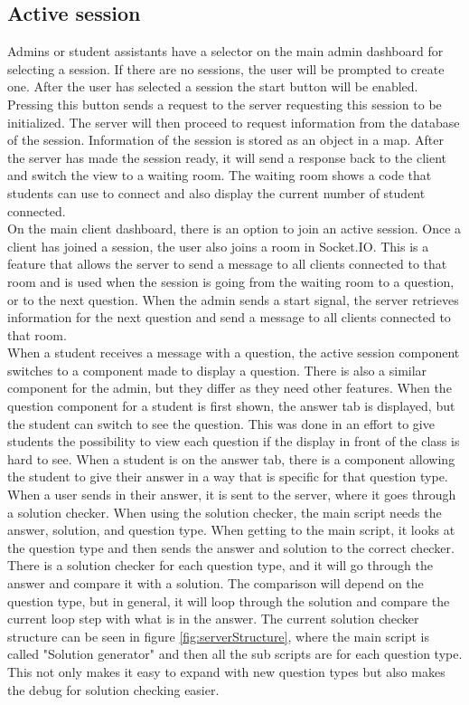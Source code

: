 \subsection{Active session}
Admins or student assistants have a selector on the main admin dashboard for selecting a session. If there are no sessions, the user will be prompted to create one. After the user has selected a session the start button will be enabled. Pressing this button sends a request to the server requesting this session to be initialized. The server will then proceed to request information from the database of the session. Information of the session is stored as an object in a map. After the server has made the session ready, it will send a response back to the client and switch the view to a waiting room. The waiting room shows a code that students can use to connect and also display the current number of student connected. 
\\[11pt]
On the main client dashboard, there is an option to join an active session. Once a client has joined a session, the user also joins a room in Socket.IO. This is a feature that allows the server to send a message to all clients connected to that room and is used when the session is going from the waiting room to a question, or to the next question. When the admin sends a start signal, the server retrieves information for the next question and send a message to all clients connected to that room.
\\[11pt]
When a student receives a message with a question, the active session component switches to a component made to display a question. There is also a similar component for the admin, but they differ as they need other features. When the question component for a student is first shown, the answer tab is displayed, but the student can switch to see the question. This was done in an effort to give students the possibility to view each question if the display in front of the class is hard to see. When a student is on the answer tab, there is a component allowing the student to give their answer in a way that is specific for that question type.
\\[11pt]
When a user sends in their answer, it is sent to the server, where it goes through a solution checker. When using the solution checker, the main script needs the answer, solution, and question type. When getting to the main script, it looks at the question type and then sends the answer and solution to the correct checker. There is a solution checker for each question type, and it will go through the answer and compare it with a solution. The comparison will depend on the question type, but in general, it will loop through the solution and compare the current loop step with what is in the answer. The current solution checker structure can be seen in figure \ref{fig:serverStructure}, where the main script is called "Solution generator" and then all the sub scripts are for each question type. This not only makes it easy to expand with new question types but also makes the debug for solution checking easier.
